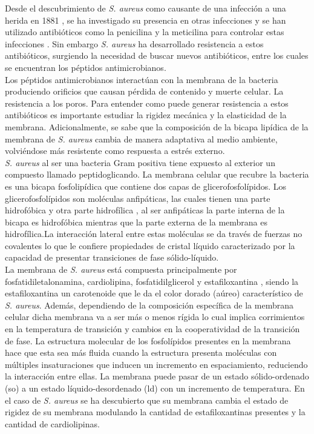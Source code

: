 \documentclass[%
 reprint,
 amsmath,amssymb,
 aps,
]{revtex4-1}
\begin{document}
Desde el descubrimiento de \textit{S. aureus} como causante de una infección a una herida en 1881 \cite{Orent2006AMagazine}, se ha investigado su presencia en otras infecciones y se han utilizado antibióticos como la penicilina y la meticilina para controlar estas infecciones \cite{1HarpavatS.NissimS.LipppincottsMicrocards:MicrobiologyFlashCards2012.}. Sin embargo \textit{S. aureus} ha desarrollado resistencia a estos antibióticos,  surgiendo la necesidad de buscar nuevos antibióticos, entre los cuales se encuentran los péptidos antimicrobianos.\\
Los péptidos antimicrobianos interactúan con la membrana de la bacteria produciendo orificios que causan pérdida de contenido y muerte celular. La resistencia a los poros. Para entender como puede generar resistencia a estos antibióticos es importante estudiar la rigidez mecánica y la elasticidad de la membrana. Adicionalmente, se sabe que la composición de la bicapa lipídica de la membrana de \textit{S. aureus} cambia de manera adaptativa al medio ambiente, volviéndose más resistente como respuesta a estrés externo.\\
\textit{S. aureus} al ser una bacteria Gram positiva tiene expuesto al exterior un compuesto llamado peptidoglicando. La membrana celular que recubre la bacteria es una bicapa fosfolipídica que contiene dos capas de glicerofosfolípidos. Los glicerofosfolípidos son moléculas anfipáticas, las cuales tienen una parte hidrofóbica y otra parte hidrofílica \cite{Nelson2011}, al ser anfipáticas la parte interna de la bicapa es hidrofóbica mientras que la parte externa de la membrana es hidrofílica.La interacción lateral entre estas moléculas se da través de fuerzas no covalentes lo que le confiere propiedades de cristal líquido caracterizado por la capacidad de presentar transiciones de fase sólido-líquido. \\
La membrana de \textit{S. aureus} está compuesta principalmente por  fosfatidiletalonamina, cardiolipina, fosfatidilglicerol y estafiloxantina \cite{Ocampo2010TheAureus}, siendo la estafiloxantina un carotenoide que le da el color dorado (aúreo) característico de \textit{S. aureus}. Además, dependiendo de la composición específica de la membrana celular dicha membrana va a ser más o menos rígida lo cual implica corrimientos en la temperatura de transición y cambios en la cooperatividad de la transición de fase. La estructura molecular de los fosfolípidos presentes en la membrana hace que esta sea más fluida cuando la estructura presenta moléculas con múltiples insaturaciones que inducen un incremento en espaciamiento, reduciendo la interacción entre ellas. La membrana puede pasar de un estado sólido-ordenado (so) a un estado líquido-desordenado (ld) con un incremento de temperatura. En el caso de \textit{S. aureus} se ha descubierto que su membrana cambia el estado de rigidez de su membrana modulando la cantidad de estafiloxantinas presentes y la cantidad de cardiolipinas. \\
\end{document}
